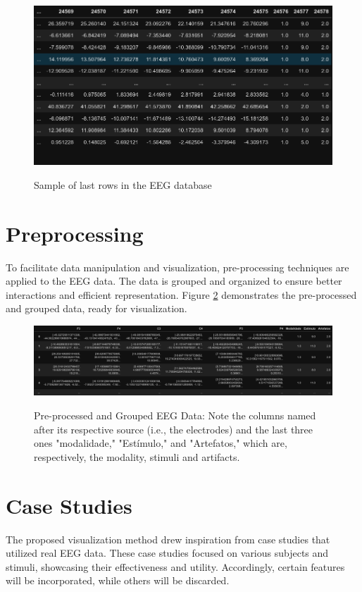 \documentclass[format=sigconf]{acmart}
\begin{document}
		\begin{figure}[h]
			\centering
			\caption{Sample of last rows in the EEG database}
			\includegraphics[width=.9\linewidth]{../presentation/images/visu05}
			\label{fig:visu05}
		\end{figure}
	
	\section{Preprocessing}
		\par To facilitate data manipulation and visualization, pre-processing techniques are applied to the EEG data. The data is grouped and organized to ensure better interactions and efficient representation. Figure \ref{fig:visu06} demonstrates the pre-processed and grouped data, ready for visualization.
	
		\begin{figure}[h]
			\centering
			\caption{Pre-processed and Grouped EEG Data: Note the columns named after its respective source (i.e., the electrodes) and the last three ones "modalidade," "Estímulo," and "Artefatos," which are, respectively, the modality, stimuli and artifacts.}
			\includegraphics[width=\linewidth]{../presentation/images/visu06}
			\label{fig:visu06}
		\end{figure}
	
	\section{Case Studies}
		\par The proposed visualization method drew inspiration from case studies that utilized real EEG data. These case studies focused on various subjects and stimuli, showcasing their effectiveness and utility. Accordingly, certain features will be incorporated, while others will be discarded.
	
\end{document}
